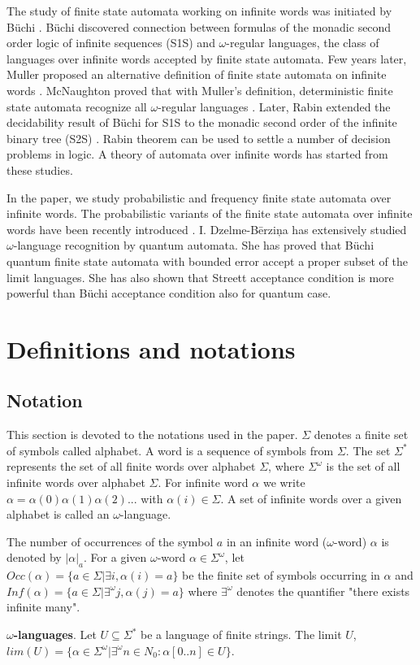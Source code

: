 \documentclass{llncs}
\begin{document}
The study of finite state automata working on infinite words was initiated by B\"uchi \cite{Bu60}. B\"uchi discovered connection between formulas of the monadic second order logic of infinite sequences (S1S) and $\omega$-regular languages, the class of languages over infinite words accepted by finite state automata. Few years later, Muller proposed an alternative definition of finite state automata on infinite words \cite{Mu63}. McNaughton proved that with Muller's definition, deterministic finite state automata recognize all $\omega$-regular languages \cite{Mc66}. Later, Rabin extended the decidability result of B\"uchi for S1S to the monadic second order of the infinite binary tree (S2S) \cite{Ra69}. Rabin theorem can be used to settle a number of decision problems in logic. A theory of automata over infinite words has started from these studies.

In the paper, we study probabilistic and frequency finite state automata over infinite words. The probabilistic variants of the finite state automata over infinite words have been recently introduced \cite{BG05}. I. Dzelme-B\= erzi\c na has extensively studied $\omega$-language recognition by quantum automata. She has proved that B\"uchi quantum finite state  automata with bounded error accept a proper subset of the limit languages. She has also shown that Streett acceptance condition is more powerful than B\"uchi acceptance condition also for quantum case. 

\section{Definitions and notations}
%
\subsection{Notation}
%
This section is devoted to the notations used in the paper. $\Sigma$ denotes a finite set of symbols called alphabet. A word is a sequence of symbols from $\Sigma$. The set $\Sigma^{*}$ represents the set of all finite words over alphabet $\Sigma$, where $\Sigma^{\omega}$ is the set of all infinite words over alphabet $\Sigma$. For infinite word $\alpha$ we write $\alpha = \alpha(0) \alpha(1) \alpha(2)...$ with $\alpha(i) \in \Sigma$. A set of infinite words over a given alphabet is called an $\omega$-language.

The number of occurrences of the symbol $a$ in an infinite word ($\omega$-word) $\alpha$ is denoted by $|\alpha|_a$. For a given $\omega$-word $\alpha \in \Sigma^{\omega}$, let $Occ(\alpha)=\{a \in \Sigma | \exists i, \alpha(i) = a\}$ be the finite set of symbols occurring in $\alpha$ and $Inf(\alpha) = \{ a \in \Sigma | \exists^\omega j, \alpha(j) = a\}$  where $\exists^\omega$ denotes the quantifier "there exists infinite many".
%
\begin{definition}
\textbf{$\omega$-languages}. Let $U \subseteq \Sigma^{*}$ be a language of finite strings. The limit $U$, $lim(U) = \{\alpha \in \Sigma^{\omega} | \exists^{\omega} n \in N_0: \alpha[0..n] \in U\}$.
\end{definition}
\end{document}
